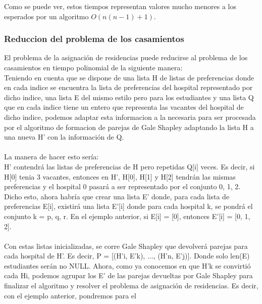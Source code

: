 \documentclass{article}
\begin{document}
                Como se puede ver, estos tiempos representan valores mucho menores a
                los esperados por un algoritmo $O(n(n-1)+1)$.
            \subsubsection{Reduccion del problema de los casamientos}
                El problema de la asignación de residencias puede reducirse al problema
                de los casamientos en tiempo polinomial de la siguiente manera: \\
                Teniendo en cuenta que se dispone de una lista H de listas de preferencias
                donde en cada indice se encuentra la lista de preferencias del hospital
                representado por dicho indice, una lista E del mismo estilo pero para los
                estudiantes y una lista Q que en cada indice tiene un entero que representa
                las vacantes del hospital de dicho indice, podemos adaptar esta informacion
                a la necesaria para ser procesada por el algoritmo de formacion de parejas de
                Gale Shapley adaptando la lista H a una nueva H' con la información de Q. \\ \\
                La manera de hacer esto sería: \\
                H' contendrá las listas de preferencias de H pero repetidas Q[i] veces. Es decir,
                si H[0] tenia 3 vacantes, entonces en H', H[0], H[1] y H[2] tendrán las mismas preferencias
                y el hospital 0 pasará a ser representado por el conjunto {0, 1, 2}. \\
                Dicho esto, ahora habría que crear una lista E' donde, para cada lista de
                preferencias E[i], existirá una lista E'[i] donde para cada hospital k, se
                pondrá el conjunto k = {p, q, r}. En el ejemplo anterior, si E[i] = [0], entonces
                E'[i] = [0, 1, 2]. \\ \\
                Con estas listas inicializadas, se corre Gale Shapley que devolverá parejas para
                cada hospital de H'. Es decir, P = [(H'i, E'k), ..., (H'n, E'j)]. Donde solo len(E) estudiantes
                serán no NULL. Ahora, como ya conocemos en que H'k se convirtió cada Hi, podemos agrupar
                los E' de las parejas devueltas por Gale Shapley para finalizar el algoritmo y resolver el
                problema de asignación de residencias. Es decir, con el ejemplo anterior, pondremos para el
\end{document}
